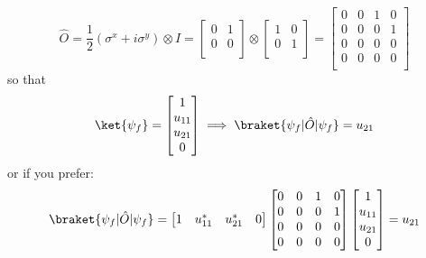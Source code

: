 \begin{equation}
    \hat{O}=\frac{1}{2}(\sigma^{x} + i\sigma^{y}) \otimes I=
    \begin{bmatrix}
        0 & 1\\
        0 & 0\\
    \end{bmatrix}
    \otimes
    \begin{bmatrix}
        1 & 0\\
        0 & 1\\
    \end{bmatrix}
    =
    \begin{bmatrix}
        0 & 0 & 1 & 0\\
        0 & 0 & 0 & 1\\
        0 & 0 & 0 & 0\\
        0 & 0 & 0 & 0\\
    \end{bmatrix}
\end{equation}
so that
\begin{equation}
    \ket{\psi_{f}}=
    \begin{bmatrix}
        1 \\
        u_{11} \\
        u_{21} \\
        0 \\
    \end{bmatrix}
    \implies
    \braket{\psi_{f}|\hat{O}|\psi_{f}} = u_{21}
\end{equation}
or if you prefer:
\begin{equation}
    \braket{\psi_{f}|\hat{O}|\psi_{f}} =
    \begin{bmatrix}
        1 & u_{11}^{*} & u_{21}^{*} & 0
    \end{bmatrix}
    \begin{bmatrix}
        0 & 0 & 1 & 0\\
        0 & 0 & 0 & 1\\
        0 & 0 & 0 & 0\\
        0 & 0 & 0 & 0\\
    \end{bmatrix}
    \begin{bmatrix}
        1 \\
        u_{11} \\
        u_{21} \\
        0 \\
    \end{bmatrix}
    = u_{21}
\end{equation}


